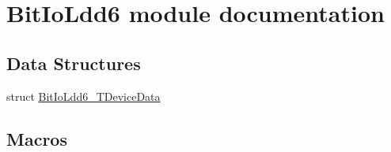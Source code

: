 \hypertarget{group___bit_io_ldd6__module}{}\section{Bit\+Io\+Ldd6 module documentation}
\label{group___bit_io_ldd6__module}
\subsection*{Data Structures}
\begin{DoxyCompactItemize}
\item 
struct \hyperlink{struct_bit_io_ldd6___t_device_data}{Bit\+Io\+Ldd6\+\_\+\+T\+Device\+Data}
\end{DoxyCompactItemize}
\subsection*{Macros}
